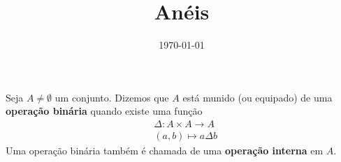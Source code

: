\documentclass{beamer}
\title{An\'eis}
\author[\autor]{\autor}
\institute[\instituto]{\instituto}
\date{\today}
\begin{document}
    \begin{frame}
        \maketitle
    \end{frame}

    
    \begin{frame}
        \begin{definicao}
            Seja $A \ne \emptyset$ um conjunto. \pause Dizemos que $A$ est{\'a} munido \pause (ou equipado) \pause de uma \textbf{opera{\c c}{\~a}o bin{\'a}ria} \pause quando existe uma fun{\c c}{\~a}o\pause
            \begin{align*}
                &\Delta : A \times A \to A\\
                &(a,b) \longmapsto a\Delta b        
            \end{align*}
            Uma opera{\c c}{\~a}o bin{\'a}ria tamb{\'e}m {\'e} chamada de uma \textbf{opera{\c c}{\~a}o interna} em $A$.\pause
        \end{definicao}
    \end{frame}
\end{document}
